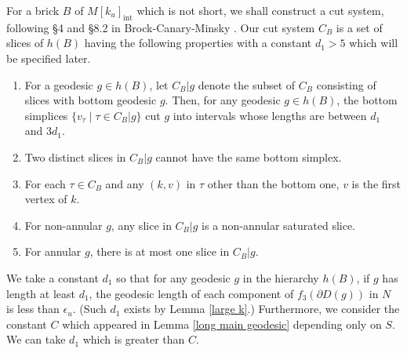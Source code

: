 \documentclass{amsart}
\theoremstyle{definition}
\numberwithin{figure}{section}
\numberwithin{equation}{section}
\newcommand{\blackboard}[1]{\ensuremath{\mathbb{#1}}}
\newcommand{\reals}{\blackboard{R}}
\newcommand{\Fr}{\mathrm{Fr}}
\def\ck{\mathcal{K}}
\begin{document}

For a brick $B$ of $M[k_u]_\mathrm{int}$ which is not short, we shall construct a cut system,
following \S 4 and \S 8.2 in Brock-Canary-Minsky \cite{bcm}.
Our cut system $C_B$ is a set of slices of $h(B)$ having the following properties with a constant $d_1>5$ which will be specified later.
\begin{enumerate}
\item For a geodesic $g \in h(B)$, let $C_B|g$ denote the subset of $C_B$ consisting of slices with bottom geodesic $g$.
Then, for any geodesic $g \in h(B)$, the bottom simplices $\{v_\tau \mid \tau \in C_B|g\}$ cut $g$ into intervals whose lengths are between $d_1$ and $3d_1$.
\item Two distinct slices in $C_B|g$ cannot have the same bottom simplex.
\item For each $\tau \in C_B$ and any $(k,v)$ in $\tau$ other than the bottom one, $v$ is the first vertex of $k$.
\item For non-annular $g$, any slice in $C_B|g$ is a non-annular saturated slice.
\item For annular $g$, there is at most one slice in $C_B|g$.
\end{enumerate}


\medskip
%

We take a constant $d_1$ so that 
for any geodesic $g$ in the hierarchy $h(B)$, if $g$ has length at least $d_1$,  the geodesic length of each component of $f_3(\partial D(g))$ in $N$ is less than $\epsilon_u$. 
(Such  $d_1$ exists by Lemma \ref{large k}.)
Furthermore, we consider the constant $C$ which appeared in Lemma \ref{long main geodesic} depending only on $S$.
We can take $d_1$ which is greater than $C$.
\end{document}
